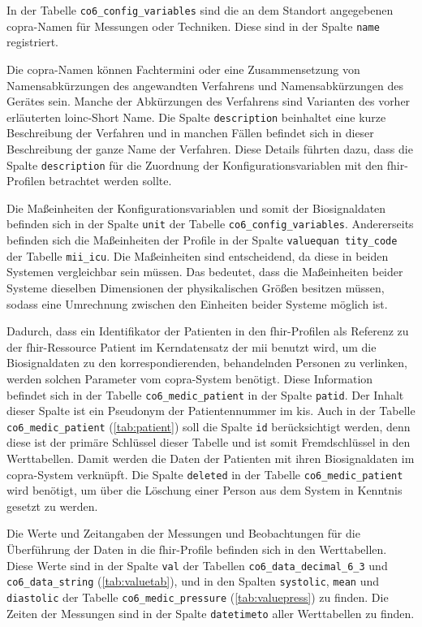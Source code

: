 In der Tabelle \texttt{co6\_config\_variables} sind die an dem Standort angegebenen \ac{copra}-Namen für Messungen oder Techniken. Diese sind in der Spalte \texttt{name} registriert. 

Die \ac{copra}-Namen können Fachtermini oder eine Zusammensetzung von Namensabkürzungen des angewandten Verfahrens und Namensabkürzungen des Gerätes sein. Manche der Abkürzungen des Verfahrens sind Varianten des vorher erläuterten \ac{loinc}-\glqq Short Name\grqq{}. Die Spalte \texttt{description} beinhaltet eine kurze Beschreibung der Verfahren und in manchen Fällen befindet sich in dieser Beschreibung der ganze Name der Verfahren. Diese Details führten dazu, dass die Spalte \texttt{description} für die Zuordnung der Konfigurationsvariablen mit den \ac{fhir}-Profilen betrachtet werden sollte.

Die Maßeinheiten der Konfigurationsvariablen und somit der Biosignaldaten befinden sich in der Spalte \texttt{unit} der Tabelle \texttt{co6\_config\_variables}. Andererseits befinden sich die Maßeinheiten der Profile in der Spalte \texttt{valuequan tity\_code} der Tabelle \texttt{mii\_icu}. Die Maßeinheiten sind entscheidend, da diese in beiden Systemen vergleichbar sein müssen. Das bedeutet, dass die Maßeinheiten beider Systeme dieselben Dimensionen der physikalischen Größen besitzen müssen, sodass eine Umrechnung zwischen den Einheiten beider Systeme möglich ist.

Dadurch, dass ein Identifikator der Patienten in den \ac{fhir}-Profilen als Referenz zu der \ac{fhir}-Ressource \glqq Patient\grqq{} im Kerndatensatz der \ac{mii} benutzt wird, um die Biosignaldaten zu den korrespondierenden, behandelnden Personen zu verlinken, werden solchen Parameter vom \ac{copra}-System benötigt. Diese Information befindet sich in der Tabelle \texttt{co6\_medic\_patient} in der Spalte \texttt{patid}. Der Inhalt dieser Spalte ist ein Pseudonym der Patientennummer im \ac{kis}. Auch in der Tabelle \texttt{co6\_medic\_patient} (\ref{tab:patient}) soll  die Spalte \texttt{id} berücksichtigt werden, denn diese ist der primäre Schlüssel dieser Tabelle und ist somit Fremdschlüssel in den Werttabellen. Damit werden die Daten der Patienten mit ihren Biosignaldaten im \ac{copra}-System verknüpft. Die Spalte \texttt{deleted} in der Tabelle \texttt{co6\_medic\_patient} wird benötigt, um über die Löschung einer Person aus dem System in Kenntnis gesetzt zu werden.

Die Werte und Zeitangaben der Messungen und Beobachtungen für die Überführung der Daten in die \ac{fhir}-Profile befinden sich in den Werttabellen. Diese Werte sind in der Spalte \texttt{val} der Tabellen \texttt{co6\_data\_decimal\_6\_3} und \texttt{co6\_data\_string} (\ref{tab:valuetab}), und in den Spalten \texttt{systolic}, \texttt{mean} und \texttt{diastolic} der Tabelle \texttt{co6\_medic\_pressure} (\ref{tab:valuepress}) zu finden. Die Zeiten der Messungen sind in der Spalte \texttt{datetimeto} aller Werttabellen zu finden.

